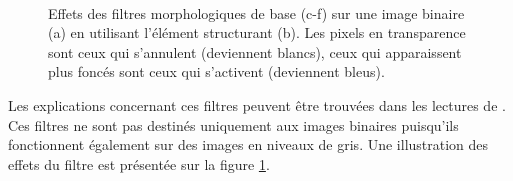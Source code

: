 			\begin{figure}\centering
				\\
				\hspace{3mm}
				\hspace{3mm}
				\hspace{3mm}
				\caption{\label{fig03:morpho_math}Effets des filtres morphologiques de base (c-f) sur une image binaire (a) en utilisant l'élément structurant (b). Les pixels en transparence sont ceux qui s'annulent (deviennent blancs), ceux qui apparaissent plus foncés sont ceux qui s'activent (deviennent bleus).}
			\end{figure}
			Les explications concernant ces filtres peuvent être trouvées dans les lectures de \citeauthor{heijmans_algebraic_1990} \citep{heijmans_algebraic_1990, ronse_algebraic_1991}. Ces filtres ne sont pas destinés uniquement aux images binaires puisqu'ils fonctionnent également sur des images en niveaux de gris. Une illustration des effets du filtre est présentée sur la figure \ref{fig03:morpho_math}.

